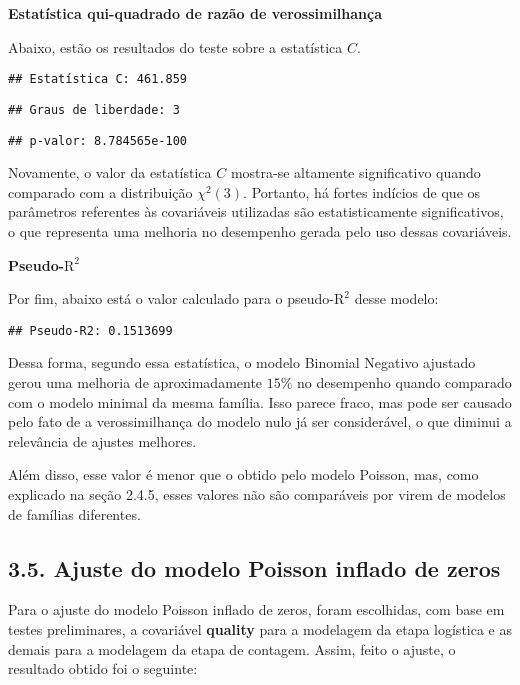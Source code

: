 \documentclass[
]{article}
\begin{document}
\textbf{Estatística qui-quadrado de razão de verossimilhança}

Abaixo, estão os resultados do teste sobre a estatística \(C\).

\begin{verbatim}
## Estatística C: 461.859
\end{verbatim}

\begin{verbatim}
## Graus de liberdade: 3
\end{verbatim}

\begin{verbatim}
## p-valor: 8.784565e-100
\end{verbatim}

Novamente, o valor da estatística \(C\) mostra-se altamente
significativo quando comparado com a distribuição \(\chi^2(3)\).
Portanto, há fortes indícios de que os parâmetros referentes às
covariáveis utilizadas são estatisticamente significativos, o que
representa uma melhoria no desempenho gerada pelo uso dessas
covariáveis.

\textbf{Pseudo-\(\text{R}^2\)}

Por fim, abaixo está o valor calculado para o pseudo-\(\text{R}^2\)
desse modelo:

\begin{verbatim}
## Pseudo-R2: 0.1513699
\end{verbatim}

Dessa forma, segundo essa estatística, o modelo Binomial Negativo
ajustado gerou uma melhoria de aproximadamente \(15\%\) no desempenho
quando comparado com o modelo minimal da mesma família. Isso parece
fraco, mas pode ser causado pelo fato de a verossimilhança do modelo
nulo já ser considerável, o que diminui a relevância de ajustes
melhores.

Além disso, esse valor é menor que o obtido pelo modelo Poisson, mas,
como explicado na seção 2.4.5, esses valores não são comparáveis por
virem de modelos de famílias diferentes.

\subsection{3.5. Ajuste do modelo Poisson inflado de
zeros}\label{ajuste-do-modelo-poisson-inflado-de-zeros}

Para o ajuste do modelo Poisson inflado de zeros, foram escolhidas, com
base em testes preliminares, a covariável \textbf{quality} para a
modelagem da etapa logística e as demais para a modelagem da etapa de
contagem. Assim, feito o ajuste, o resultado obtido foi o seguinte:
\end{document}
